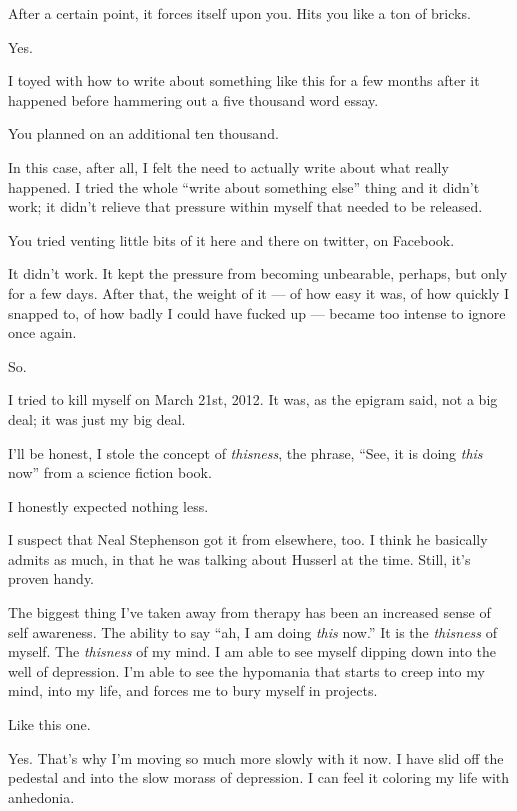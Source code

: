 \begin{ally}
After a certain point, it forces itself upon you. Hits you like a ton of bricks.
\end{ally}
Yes.

I toyed with how to write about something like this for a few months after it happened before hammering out a five thousand word essay.

\begin{ally}
You planned on an additional ten thousand.
\end{ally}
In this case, after all, I felt the need to actually write about what really happened. I tried the whole ``write about something else'' thing and it didn't work; it didn't relieve that pressure within myself that needed to be released.

\begin{ally}
You tried venting little bits of it here and there on twitter, on Facebook.
\end{ally}
It didn't work. It kept the pressure from becoming unbearable, perhaps, but only for a few days. After that, the weight of it --- of how easy it was, of how quickly I snapped to, of how badly I could have fucked up --- became too intense to ignore once again.

So.

I tried to kill myself on March 21st, 2012. It was, as the epigram said, not a big deal; it was just my big deal.
\newpage

I'll be honest, I stole the concept of \emph{thisness}, the phrase, ``See, it is doing \emph{this} now'' from a science fiction book.

\begin{ally}
I honestly expected nothing less.
\end{ally}
I suspect that Neal Stephenson got it from elsewhere, too. I think he basically admits as much, in that he was talking about Husserl at the time. Still, it's proven handy.

The biggest thing I've taken away from therapy has been an increased sense of self awareness. The ability to say ``ah, I am doing \emph{this} now.'' It is the \emph{thisness} of myself. The \emph{thisness} of my mind. I am able to see myself dipping down into the well of depression. I'm able to see the hypomania that starts to creep into my mind, into my life, and forces me to bury myself in projects.

\begin{ally}
Like this one.
\end{ally}
Yes. That's why I'm moving so much more slowly with it now. I have slid off the pedestal and into the slow morass of depression. I can feel it coloring my life with anhedonia.

